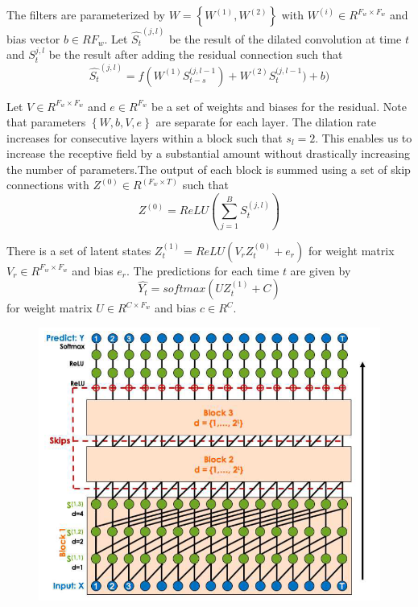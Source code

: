 The filters are parameterized by $W = \left\{W^{(1)},W^{(2)}\right\}$ with $W^{(i)} \in R^{F_w \times F_w}$ and bias vector $b \in R{F_w}$. Let $\hat{S_t}^{(j,l)}$ be the result of the dilated convolution at time $t$ and $S_t^{j,l}$ be the result after adding the residual connection such that $$\hat{S_t}^{(j,l)} = f(W^{(1)}S_{t-s}^{(j,l-1})+W^{(2)}S_{t}^{(j,l-1})+b)$$

Let $V \in R^{F_w \times F_w}$ and $e \in R^{F_w}$ be a set of weights and biases for the residual. Note that parameters $\left\{W,b,V,e\right\}$ are separate for each layer.
The dilation rate increases for consecutive layers within a block such that $s_l = 2$. This enables us to increase the receptive field by a substantial amount without drastically increasing the number of parameters.The output of each block is summed using a set of skip connections with $Z^{(0)} \in R^{(F_w \times T)}$ such that $$Z^{(0)} = ReLU(\sum_{j=1}^B S_t^{(j,l)})$$

There is a set of latent states $Z_t^{(1)} = ReLU(V_rZ_t^{(0)} + e_r)$ for weight matrix $V_r \in R^{F_w \times F_w}$ and bias $e_r$. The predictions for each time $t$ are given by $$\hat{Y_t} = softmax(UZ_t^{(1)}+C)$$ for weight matrix $U \in R^{C \times F_w}$ and bias $c \in R^C$.

\begin{figure}[h]
    \includegraphics[width=\textwidth]{../Figures/ch3_2.png}
    \label{fig:dtcn}
\end{figure}

